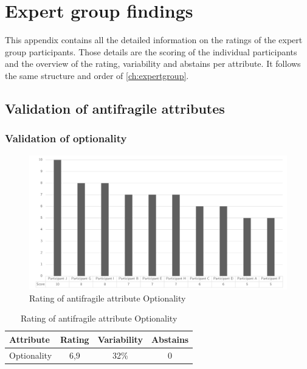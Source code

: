 \chapter{Expert group findings}
This appendix contains all the detailed information on the ratings of the expert group participants. Those details are the scoring of the individual participants and the overview of the rating, variability and abstains per \gls{attribute}. It follows the same structure and order of \cref{ch:expertgroup}.
\section{Validation of antifragile attributes}
\label{sec:validationofafattributes}
\subsection{Validation of optionality}
\label{sub:validationofoptionality}
\begin{figure}[H]
	\centering
	\includegraphics[width=0.9\linewidth]{images/scoreafoptionality}
	\caption[Rating of antifragile attribute Optionality]{Rating of antifragile attribute Optionality}
	\label{fig:appscoringafoptionality}
\end{figure}
\begin{table}[H]
	\centering
	\begin{tabular}{p{}ccc}
		\toprule
		\textbf{Attribute} & \textbf{Rating} & \textbf{Variability} & \textbf{Abstains} \\
		\midrule
		Optionality & 6,9 & 32\% & 0 \\%
		\bottomrule
	\end{tabular}%
	\caption[Rating of antifragile attribute Optionality]{Rating of antifragile attribute Optionality}
	\label{tab:appscoringafoptionality}%
\end{table}%
\newpage
